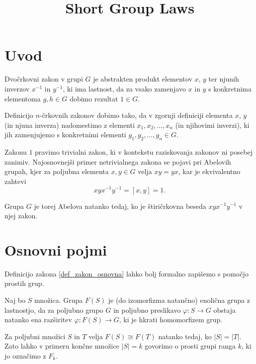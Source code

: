 \documentclass[mat1, tisk]{fmfdelo}
\title{Short Group Laws}
\numberwithin{equation}{section}  %
\begin{document}
\section{Uvod}


Dvočrkovni zakon v grupi $G$ je abstrakten produkt elementov $x$, $y$ ter njunih inverzov $x^{-1}$ in $y^{-1}$, ki ima lastnost, da za vsako zamenjavo $x$ in $y$ s konkretnima
elementoma $g, h \in G$ dobimo rezultat $1 \in G$.

\begin{opomba}
Definicijo $n$-črkovnih zakonov dobimo tako, da v zgornji definiciji elementa $x$, $y$ (in njuna inverza) nadomestimo z elementi $x_1, x_2, \ldots, x_n$ (in njihovimi inverzi),
ki jih zamenjujemo s konkretnimi elementi $g_1, g_2, \ldots, g_{n} \in G$.
\end{opomba}

\noindent
Zakonu $1$ pravimo trivialni zakon, ki v kontekstu raziskovanja zakonov ni posebej zanimiv. Najosnovnejši primer netrivialnega zakona se pojavi pri Abelovih grupah, kjer za poljubna elementa $x,y \in  G$ velja $xy = yx$, kar je ekvivalentno
zahtevi \begin{equation*}
xyx^{-1}y^{-1} = [x,y] = 1.
\end{equation*}

\noindent
Grupa $G$ je torej Abelova natanko tedaj, ko je štiričrkovna beseda $xyx^{-1}y^{-1}$ v njej zakon. 


\section{Osnovni pojmi}

Definicijo zakona \ref{def_zakon_osnovna} lahko bolj formalno zapišemo s pomočjo prostih grup.

\begin{definicija}
\label{def_prosta_grupa}
Naj bo $S$ množica. Grupa $F(S)$ je (do izomorfizma natančno) enolična grupa z lastnostjo, da za poljubno grupo $G$ in poljubno preslikavo
$\varphi: S \to G$ obstaja natanko ena razširitev $\varphi: F(S) \to G$, ki je hkrati homomorfizem grup. 
\end{definicija}

\begin{opomba}
Za poljubni množici $S$ in $T$ velja $F(S) \cong F(T)$ natanko tedaj, ko $\lvert S \rvert = \lvert T \rvert$. Zato lahko v primeru končne množice $\lvert S \rvert = k$ govorimo o 
prosti grupi ranga $k$, ki jo označimo z $F_k$.
\end{opomba}
\end{document}
